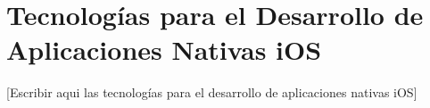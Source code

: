 
\section{Tecnologías para el Desarrollo de Aplicaciones Nativas iOS}

[Escribir aqui las tecnologías para el desarrollo de aplicaciones nativas iOS]
